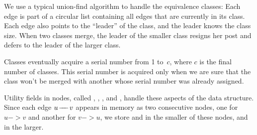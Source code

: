 We use a typical union-find algorithm to handle the equivalence
classes: Each edge is part of a circular list containing all edges
that are currently in its class. Each edge also points to the
``leader'' of the class, and the leader knows the class size.
When two classes merge, the leader of the smaller class resigns her
post and defers to the leader of the larger class.

Classes eventually acquire a serial number from 1 to~$c$, where $c$ is
the final number of classes. This serial number is acquired only when
we are sure that the class won't be merged with another whose serial
number was already assigned.

Utility fields in  nodes, called , , %
, and ,
handle these aspects of the data structure. Since each edge $u\mathrel{\!\mathrel-\mkern-8mu\mathrel-\mkern-8mu\mathrel-\!} v$
appears in memory as two consecutive  nodes,
one for $u->v$ and another for $v->u$, we
store  and  in the smaller of these nodes,
 and  in the larger.

